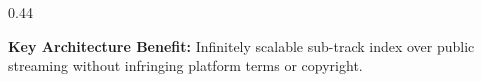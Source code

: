 \begin{frame}[t]
\begin{columns}[onlytextwidth, T]
\begin{column}{0.44\textwidth}
      \vspace{1.5mm}

      \begin{tcolorbox}[innercard, top=2.5pt, bottom=2.5pt]
        {\tiny\textbf{\textcolor{accentemerald}{Key Architecture Benefit:}} \textcolor{textmuted}{Infinitely scalable sub-track index over public streaming without infringing platform terms or copyright.}}
      \end{tcolorbox}
    \end{column}
  \end{columns}
\end{frame}